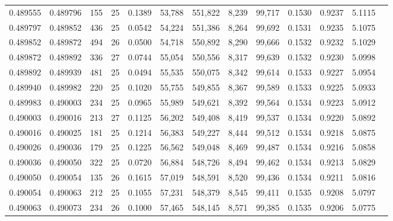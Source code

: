 \begin{tabular}{rrrrrrrrrrrrr}
0.489555 & 0.489796 & 155 &  25 &                                     0.1389 &  53,788 & 551,822 &   8,239 &  99,717 & 0.1530 & 0.9237 & 5.1115 \\
0.489797 & 0.489852 & 436 &  25 &                                     0.0542 &  54,224 & 551,386 &   8,264 &  99,692 & 0.1531 & 0.9235 & 5.1075 \\
0.489852 & 0.489872 & 494 &  26 &                                     0.0500 &  54,718 & 550,892 &   8,290 &  99,666 & 0.1532 & 0.9232 & 5.1029 \\
0.489872 & 0.489892 & 336 &  27 &                                     0.0744 &  55,054 & 550,556 &   8,317 &  99,639 & 0.1532 & 0.9230 & 5.0998 \\
0.489892 & 0.489939 & 481 &  25 &                                     0.0494 &  55,535 & 550,075 &   8,342 &  99,614 & 0.1533 & 0.9227 & 5.0954 \\
0.489940 & 0.489982 & 220 &  25 &                                     0.1020 &  55,755 & 549,855 &   8,367 &  99,589 & 0.1533 & 0.9225 & 5.0933 \\
0.489983 & 0.490003 & 234 &  25 &                                     0.0965 &  55,989 & 549,621 &   8,392 &  99,564 & 0.1534 & 0.9223 & 5.0912 \\
0.490003 & 0.490016 & 213 &  27 &                                     0.1125 &  56,202 & 549,408 &   8,419 &  99,537 & 0.1534 & 0.9220 & 5.0892 \\
0.490016 & 0.490025 & 181 &  25 &                                     0.1214 &  56,383 & 549,227 &   8,444 &  99,512 & 0.1534 & 0.9218 & 5.0875 \\
0.490026 & 0.490036 & 179 &  25 &                                     0.1225 &  56,562 & 549,048 &   8,469 &  99,487 & 0.1534 & 0.9216 & 5.0858 \\
0.490036 & 0.490050 & 322 &  25 &                                     0.0720 &  56,884 & 548,726 &   8,494 &  99,462 & 0.1534 & 0.9213 & 5.0829 \\
0.490050 & 0.490054 & 135 &  26 &                                     0.1615 &  57,019 & 548,591 &   8,520 &  99,436 & 0.1534 & 0.9211 & 5.0816 \\
0.490054 & 0.490063 & 212 &  25 &                                     0.1055 &  57,231 & 548,379 &   8,545 &  99,411 & 0.1535 & 0.9208 & 5.0797 \\
0.490063 & 0.490073 & 234 &  26 &                                     0.1000 &  57,465 & 548,145 &   8,571 &  99,385 & 0.1535 & 0.9206 & 5.0775 \\

\end{tabular}
